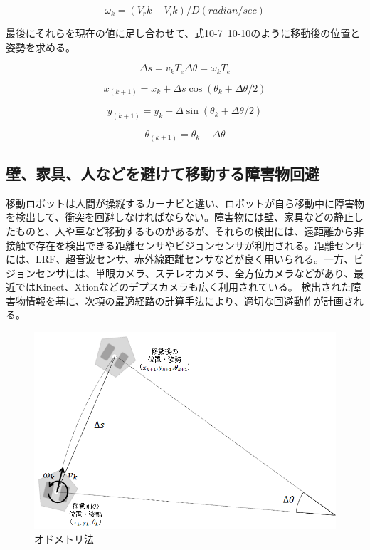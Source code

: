 \begin{equation}
\omega_k=(V_rk-V_lk)/D     (radian/sec)
\end{equation}

最後にそれらを現在の値に足し合わせて、式10-7~10-10のように移動後の位置と姿勢を求める。

\begin{equation}
\Delta s=v_k T_e
\Delta\theta=\omega_k T_e
\end{equation}

\begin{equation}
x_(k+1)=x_k+\Delta s \cos(\theta_k+\Delta\theta/2)
\end{equation}

\begin{equation}
y_(k+1)=y_k+\Delta \sin(\theta_k+\Delta\theta/2)
\end{equation}

\begin{equation}
\theta_(k+1)=\theta_k+\Delta\theta
\end{equation}

\subsection{壁、家具、人などを避けて移動する障害物回避}

移動ロボットは人間が操縦するカーナビと違い、ロボットが自ら移動中に障害物を検出して、衝突を回避しなければならない。障害物には壁、家具などの静止したものと、人や車など移動するものがあるが、それらの検出には、遠距離から非接触で存在を検出できる距離センサやビジョンセンサが利用される。距離センサには、LRF、超音波センサ、赤外線距離センサなどが良く用いられる。一方、ビジョンセンサには、単眼カメラ、ステレオカメラ、全方位カメラなどがあり、最近ではKinect、Xtionなどのデプスカメラも広く利用されている。  検出された障害物情報を基に、次項の最適経路の計算手法により、適切な回避動作が計画される。

\begin{figure}[ht]
  \centering
  \includegraphics[width=\columnwidth]{pictures/chapter10/pic_10_03.png}
  \caption{オドメトリ法}
\end{figure}

